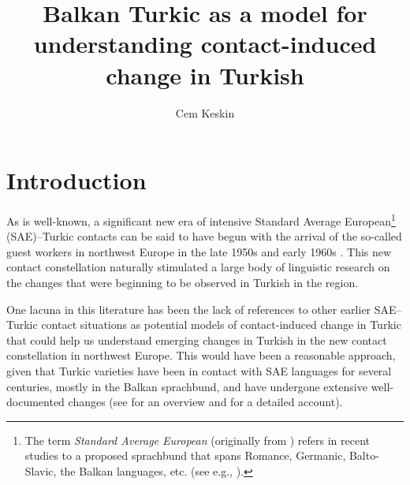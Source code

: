 \documentclass[output=paper,colorlinks,citecolor=brown]{langscibook}
\author{Cem Keskin\orcid{0000-0002-7398-7032}\affiliation{University of Potsdam, Leibniz-Centre General Linguistics (ZAS)}}
\title[Balkan Turkic]{Balkan Turkic as a model for understanding contact-induced change in Turkish}
\begin{document}
\maketitle

\section{Introduction} 

As is well-known, a significant new era of intensive Standard Average European\footnote{The term \textit{Standard Average European} (originally from \citealt{Whorf.1944}) refers in recent studies to a proposed sprachbund that spans Romance, Germanic, Balto-Slavic, the Balkan languages, etc. (see e.g., \citealt{Haspelmath.1998, Haspelmath.2001.SAE,vanderAuwera.2011}).} (SAE)--Turkic contacts can be said to have begun with the arrival of the so-called guest workers in northwest Europe in the late 1950s and early 1960s \citep[83--84]{Kucukcan.Gungor.Turks}. This new contact constellation naturally stimulated a large body of linguistic research on the changes that were beginning to be observed in Turkish in the region. 

One lacuna in this literature has been the lack of references to other earlier SAE--Turkic contact situations as potential models of contact-induced change in Turkic that could help us understand emerging changes in Turkish in the new contact constellation in northwest Europe. This would have been a reasonable approach, given that Turkic varieties have been in contact with SAE languages for several centuries, mostly in the Balkan sprachbund, and have undergone extensive well-documented changes (see \citealt[Ch. 10]{Johanson.2021} for an overview and \citealt{johanson1992strukturelle,johanson2013structural} for a detailed account). 
\end{document}
